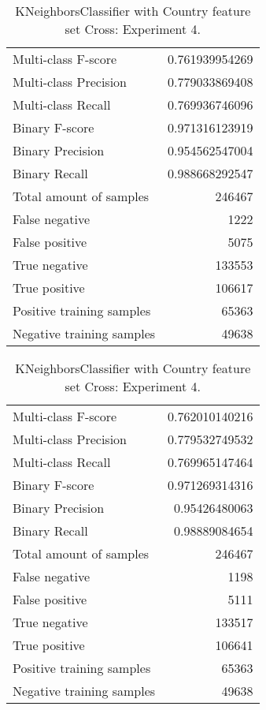 \begin{table}[H]
\begin{minipage}{0.5\textwidth}
\caption{KNeighborsClassifier with Country feature set Cross: Experiment 3.}
\centering
\begin{tabular}{l r}
\toprule
Multi-class F-score & 0.761939954269 \\
Multi-class Precision & 0.779033869408 \\
Multi-class Recall & 0.769936746096 \\
\midrule
Binary F-score & 0.971316123919 \\
Binary Precision & 0.954562547004 \\
Binary Recall & 0.988668292547 \\
\midrule
Total amount of samples & 246467 \\
False negative & 1222 \\
False positive & 5075 \\
True negative & 133553 \\
True positive & 106617 \\
\midrule
Positive training samples & 65363 \\
Negative training samples & 49638 \\
\bottomrule
\end{tabular}
\end{minipage}
\hfillx
\begin{minipage}{0.5\textwidth}
\caption{KNeighborsClassifier with Country feature set Cross: Experiment 4.}
\centering
\begin{tabular}{l r}
\toprule
Multi-class F-score & 0.762010140216 \\
Multi-class Precision & 0.779532749532 \\
Multi-class Recall & 0.769965147464 \\
\midrule
Binary F-score & 0.971269314316 \\
Binary Precision & 0.95426480063 \\
Binary Recall & 0.98889084654 \\
\midrule
Total amount of samples & 246467 \\
False negative & 1198 \\
False positive & 5111 \\
True negative & 133517 \\
True positive & 106641 \\
\midrule
Positive training samples & 65363 \\
Negative training samples & 49638 \\
\bottomrule
\end{tabular}
\end{minipage}
\end{table}
